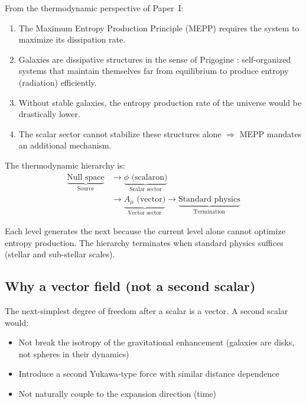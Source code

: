 \documentclass[aps,prd,twocolumn,superscriptaddress,nofootinbib]{revtex4-2}
\begin{document}
From the thermodynamic perspective of Paper~I:
\begin{enumerate}
\item The Maximum Entropy Production Principle (MEPP) \cite{Dewar2003,Martyushev2006} requires the system to maximize its dissipation rate.
\item Galaxies are dissipative structures in the sense of Prigogine \cite{Prigogine1977}: self-organized systems that maintain themselves far from equilibrium to produce entropy (radiation) efficiently.
\item Without stable galaxies, the entropy production rate of the universe would be drastically lower.
\item The scalar sector cannot stabilize these structures alone $\Rightarrow$ MEPP mandates an additional mechanism.
\end{enumerate}

The thermodynamic hierarchy is:
\begin{equation}
\begin{split}
\underbrace{\text{Null space}}_{\text{Source}} &\to \underbrace{\phi \text{ (scalaron)}}_{\text{Scalar sector}} \\
&\to \underbrace{A_\mu \text{ (vector)}}_{\text{Vector sector}} \to \underbrace{\text{Standard physics}}_{\text{Termination}}
\end{split}
\label{eq:hierarchy}
\end{equation}

Each level generates the next because the current level alone cannot optimize entropy production. The hierarchy terminates when standard physics suffices (stellar and sub-stellar scales).

\subsection{Why a vector field (not a second scalar)}
\label{sec:why_vector_not_scalar}

The next-simplest degree of freedom after a scalar is a vector. A second scalar would:
\begin{itemize}
\item Not break the isotropy of the gravitational enhancement (galaxies are disks, not spheres in their dynamics)
\item Introduce a second Yukawa-type force with similar distance dependence
\item Not naturally couple to the expansion direction (time)
\end{itemize}
\end{document}
